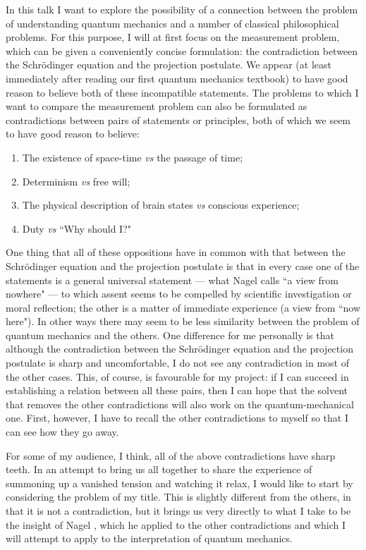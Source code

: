 \documentclass[12pt,a4paper,reqno]{article}
\renewcommand{\(}{\left(}
\renewcommand{\)}{\right)}
\newcommand{\<}{\langle}
\renewcommand{\>}{\rangle}
\theoremstyle{plain} %
\theoremstyle{definition}
\theoremstyle{remark}
\begin{document}
In this talk I want to explore the possibility of a connection between
the problem of understanding quantum mechanics and a number of classical
philosophical problems. For this purpose, I will at first
focus on the measurement problem, which can be given a conveniently
concise formulation: the contradiction between the Schr\"odinger
equation and the projection postulate. We appear (at least immediately
after reading our first quantum mechanics textbook) to have good reason to
believe both of these incompatible statements. The problems to which I want 
to compare the measurement problem can also be formulated as
contradictions between pairs of statements or principles, both of which
we seem to have good reason to believe:
\begin{enumerate}
\item The existence of space-time \emph{vs} the passage of time;
\item Determinism \emph{vs} free will;
\item The physical description of brain states \emph{vs} conscious experience;
\item Duty \emph{vs} ``Why should I?"
\end{enumerate}
One thing that all of these oppositions have in common with that between
the Schr\"odinger equation and the projection postulate is that in every
case one of the statements is a general universal statement --- what
Nagel \cite{Nagel:nowhere} calls ``a view from nowhere" --- to which
assent seems to be compelled by scientific investigation or moral
reflection; the other is a matter of immediate experience (a view from
``now here"). In other ways
there may seem to be less similarity between the problem of quantum
mechanics and the others. One difference for me personally is that
although the contradiction between the Schr\"odinger equation and the
projection postulate is sharp and uncomfortable, I do not see any
contradiction in most of the other cases. This, of course, is favourable
for my project: if I can succeed in establishing a relation between
all these pairs, then I can hope that the solvent that removes 
the other contradictions will also work on the quantum-mechanical one.
First, however, I have to recall the other contradictions to myself 
so that I can see how they go away. 

For some of my audience, I think, all of the above contradictions have
sharp teeth. In an attempt to bring us all together to share the
experience of summoning up a vanished tension and watching it relax, I
would like to start by considering the problem of my title. This is
slightly different from the others, in that it is not a contradiction,
but it brings us very directly to what I take to be the insight of Nagel
\cite{Nagel:subjobj, Nagel:nowhere}, which he applied to the other contradictions and 
which I will attempt to apply to the interpretation of quantum
mechanics.
\end{document}
